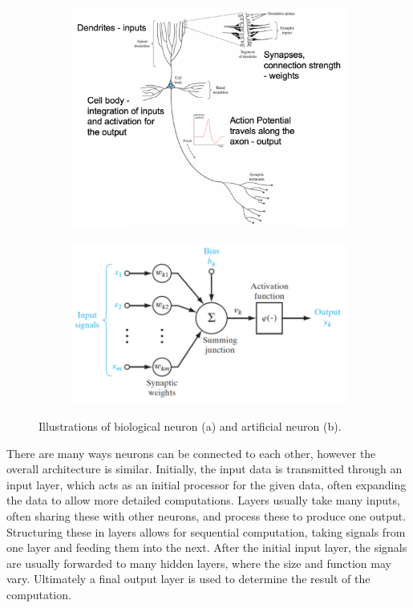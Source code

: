 \documentclass[parskip=half,notes,cadrem,toolver]{iisvlsi}
\begin{document}
\begin{figure}[H]
\centering
    \begin{subfigure}[t]{0.45\linewidth}
        \centering
        \includegraphics[width=\textwidth]{figures/Neuron.png}
        \caption{}
        \label{fig:neuron}
    \end{subfigure}
    \begin{subfigure}[t]{0.45\linewidth}
        \centering
        \includegraphics[width=\textwidth]{figures/ANN_1.png}
        \caption{}
        \label{fig:ann_1}
    \end{subfigure}
    \caption{Illustrations of biological neuron (a) and artificial neuron (b).}
    \label{fig:biological_artificial_nn}
\end{figure}


There are many ways neurons can be connected to each other, however the overall architecture is similar. Initially, the input data is transmitted through an input layer, which acts as an initial processor for the given data, often expanding the data to allow more detailed computations. Layers usually take many inputs, often sharing these with other neurons, and process these to produce one output. Structuring these in layers allows for sequential computation, taking signals from one layer and feeding them into the next. After the initial input layer, the signals are usually forwarded to many hidden layers, where the size and function may vary. Ultimately a final output layer is used to determine the result of the computation. 
\end{document}
